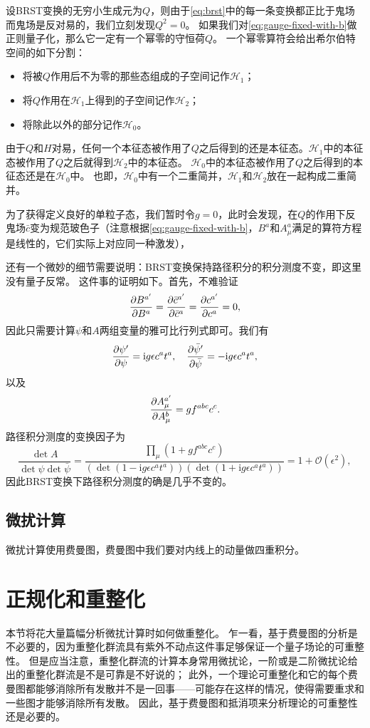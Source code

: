 \documentclass[hyperref, UTF8, a4paper]{ctexart}
\newcommand*{\ii}{\mathrm{i}}
\begin{document}
设BRST变换的无穷小生成元为$Q$，则由于\eqref{eq:brst}中的每一条变换都正比于鬼场而鬼场是反对易的，我们立刻发现$Q^2=0$。
如果我们对\eqref{eq:gauge-fixed-with-b}做正则量子化，那么它一定有一个幂零的守恒荷$Q$。
一个幂零算符会给出希尔伯特空间的如下分割：
\begin{itemize}
    \item 将被$Q$作用后不为零的那些态组成的子空间记作$\mathcal{H}_1$；
    \item 将$Q$作用在$\mathcal{H}_1$上得到的子空间记作$\mathcal{H}_2$；
    \item 将除此以外的部分记作$\mathcal{H}_0$。
\end{itemize}
由于$Q$和$H$对易，任何一个本征态被作用了$Q$之后得到的还是本征态。$\mathcal{H}_1$中的本征态被作用了$Q$之后就得到$\mathcal{H}_2$中的本征态。
$\mathcal{H}_0$中的本征态被作用了$Q$之后得到的本征态还是在$\mathcal{H}_0$中。
也即，$\mathcal{H}_0$中有一个二重简并，$\mathcal{H}_1$和$\mathcal{H}_2$放在一起构成二重简并。

为了获得定义良好的单粒子态，我们暂时令$g=0$，此时会发现，在$Q$的作用下反鬼场$\bar{c}$变为规范玻色子（注意根据\eqref{eq:gauge-fixed-with-b}，$B^a$和$A^a_\mu$满足的算符方程是线性的，它们实际上对应同一种激发），

还有一个微妙的细节需要说明：BRST变换保持路径积分的积分测度不变，即这里没有量子反常。
这件事的证明如下。首先，不难验证
\[
    \pdv{B^{a'}}{B^a} = \pdv{\bar{c}^{a'}}{\bar{c}^{a}} = \pdv{c^{a'}}{c^a} = 0,
\]
因此只需要计算$\psi$和$A$两组变量的雅可比行列式即可。我们有
\[
    \pdv{\psi'}{\psi} = \ii g \epsilon c^a t^a, \quad \pdv{\bar{\psi}'}{\bar{\psi}} = - \ii g \epsilon c^a t^a,
\]
以及
\[
    \pdv{A^{a'}_\mu}{A^b_\mu} = g f^{abc} c^c.
\]
路径积分测度的变换因子为
\[
    \frac{\det A}{\det \psi \det \bar{\psi}} = \frac{\prod_\mu (1 + g f^{abc} c^c)}{(\det (1 - \ii g \epsilon c^a t^a)) (\det (1 + \ii g \epsilon c^a t^a))} = 1 + \mathcal{O}(\epsilon^2),
\]
因此BRST变换下路径积分测度的确是几乎不变的。

\subsection{微扰计算}

微扰计算使用费曼图，费曼图中我们要对内线上的动量做四重积分。

\section{正规化和重整化}

本节将花大量篇幅分析微扰计算时如何做重整化。
乍一看，基于费曼图的分析是不必要的，因为重整化群流具有紫外不动点这件事足够保证一个量子场论的可重整性。
但是应当注意，重整化群流的计算本身常用微扰论，一阶或是二阶微扰论给出的重整化群流是不是可靠是不好说的；
此外，一个理论可重整化和它的每个费曼图都能够消除所有发散并不是一回事——可能存在这样的情况，使得需要重求和一些图才能够消除所有发散。
因此，基于费曼图和抵消项来分析理论的可重整性还是必要的。
\end{document}
